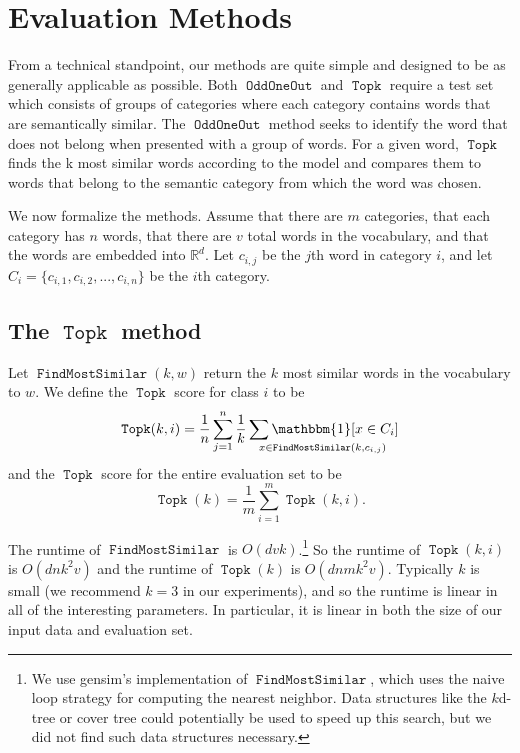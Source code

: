\documentclass[11pt,a4paper]{article}
\newcommand{\indicator}[1]{\mathbbm{1}\!\left[{#1}\right]}
\newcommand{\R}{\mathbb R}
\DeclareMathOperator{\FindMostSimilar}{\texttt{FindMostSimilar}}
\DeclareMathOperator{\OddOneOut}{\texttt{OddOneOut}}
\DeclareMathOperator{\topk}{\texttt{Topk}}
\begin{document}
\section{Evaluation Methods}
\label{sec:method}
From a technical standpoint, our methods are quite simple and designed to be as generally applicable as possible.
 Both $\OddOneOut$ and $\topk$ require a test set which consists of groups of categories where each category contains words that are semantically similar. 
 The $\OddOneOut$ method seeks to identify the word that does not belong when presented with a group of words.
  For a given word, $\topk$ finds the k most similar words according to the model and compares them to words that belong to the semantic category from which the word was chosen.


We now formalize the methods. 
Assume that there are $m$ categories, that each category has $n$ words, that there are $v$ total words in the vocabulary, and that the words are embedded into $\R^d$.
Let $c_{i,j}$ be the $j$th word in category $i$,
and let $C_i = \{c_{i,1}, c_{i,2}, ..., c_{i,n}\}$ be the $i$th category.

\subsection{The $\topk$ method}
Let $\FindMostSimilar(k,w)$ return the $k$ most similar words in the vocabulary to $w$.
We define the $\topk$ score for class $i$ to be
\begin{equation}
    \topk(k,i) = \frac{1}{n}\sum_{j=1}^n \frac{1}{k}\sum_{\mathrlap{x \in \FindMostSimilar(k, c_{i,j})}} \indicator{x \in C_i}
\end{equation}
and the $\topk$ score for the entire evaluation set to be
\begin{equation}
    \topk(k) = \frac{1}{m}\sum_{i=1}^m \topk(k,i)
    .
\end{equation}

The runtime of $\FindMostSimilar$ is $O(dvk)$.\footnote{
    We use gensim's implementation of $\FindMostSimilar$,
    which uses the naive loop strategy for computing the nearest neighbor.
    Data structures like the $k$d-tree or cover tree could potentially be used to speed up this search,
    but we did not find such data structures necessary.
}
So the runtime of $\topk(k,i)$ is $O(dnk^2v)$
and the runtime of $\topk(k)$ is $O(dnmk^2v)$.
Typically $k$ is small (we recommend $k=3$ in our experiments),
and so the runtime is linear in all of the interesting parameters.
In particular, it is linear in both the size of our input data and evaluation set.
\end{document}
